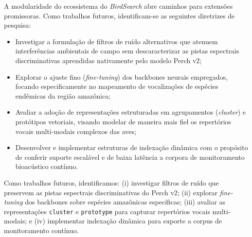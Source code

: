 \documentclass[12pt]{article}
\begin{document}
A modularidade do ecossistema do \emph{BirdSearch} abre caminhos para extensões promissoras. Como trabalhos futuros, identificam-se as seguintes diretrizes de pesquisa:
\begin{itemize}
    \item Investigar a formulação de filtros de ruído alternativos que atenuem interferências ambientais de campo sem descaracterizar as pistas espectrais discriminativas aprendidas nativamente pelo modelo Perch v2;
    \item Explorar o ajuste fino (\emph{fine-tuning}) dos backbones neurais empregados, focando especificamente no mapeamento de vocalizações de espécies endêmicas da região amazônica;
    \item Avaliar a adoção de representações estruturadas em agrupamentos (\emph{cluster}) e protótipos vetoriais, visando modelar de maneira mais fiel os repertórios vocais multi-modais complexos das aves;
    \item Desenvolver e implementar estruturas de indexação dinâmica com o propósito de conferir suporte escalável e de baixa latência a corpora de monitoramento bioacústico contínuo.
\end{itemize}

Como trabalhos futuros, identificamos: (i) investigar filtros de ruído que
preservem as pistas espectrais discriminativas do Perch v2; (ii) explorar
\textit{fine-tuning} dos backbones sobre espécies amazônicas específicas; (iii)
avaliar as representações \texttt{cluster} e \texttt{prototype} para capturar
repertórios vocais multi-modais; e (iv) implementar indexação dinâmica para
suporte a corpus de monitoramento contínuo.



\end{document}
